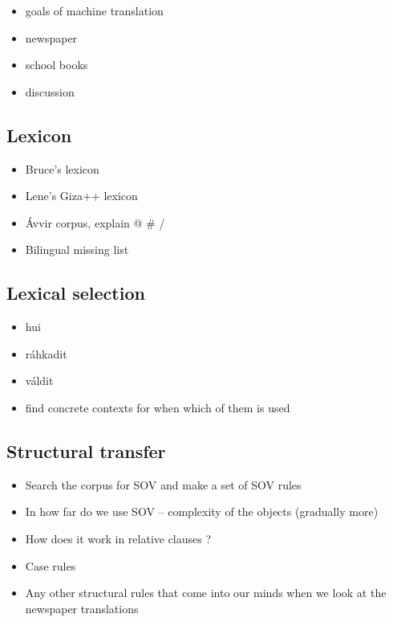 \documentclass[a4paper,english,12pt]{article}
\begin{document}
\begin{itemize}
\item goals of machine translation
\item newspaper 
\item school books
\item discussion
\end{itemize}

\subsection{Lexicon}
\begin{itemize}
\item Bruce's lexicon
\item Lene's Giza++ lexicon
\item Ávvir corpus, explain @ \# /
\item Bilingual missing list
\end{itemize}

\subsection{Lexical selection}
\begin{itemize}
\item hui
\item ráhkadit
\item váldit
\item find concrete contexts for when which of them is used
\end{itemize}

\subsection{Structural transfer} 

\begin{itemize}
  \item Search the corpus for SOV and make a set of SOV rules
  \item In how far do we use SOV -- complexity of the objects (gradually more)
  \item How does it work in relative clauses ?
  \item Case rules
  \item Any other structural rules that come into our minds when we look at the newspaper translations
\end{itemize}
\end{document}
